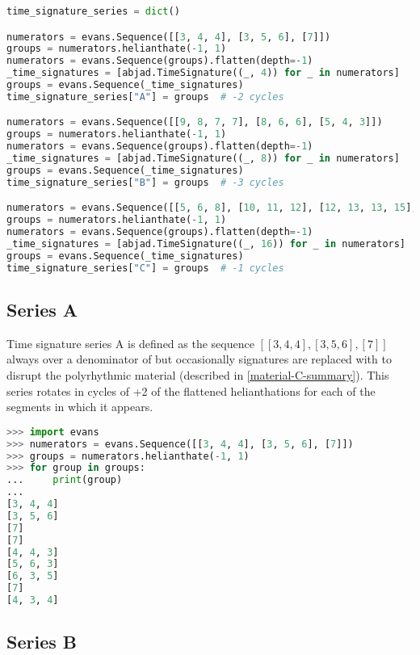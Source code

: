 \begin{lstlisting}[language=Python,frame=tb,caption={Generating processes for time signatures in Polillas},label=lst:p-sigs]
time_signature_series = dict()

numerators = evans.Sequence([[3, 4, 4], [3, 5, 6], [7]])
groups = numerators.helianthate(-1, 1)
numerators = evans.Sequence(groups).flatten(depth=-1)
_time_signatures = [abjad.TimeSignature((_, 4)) for _ in numerators]
groups = evans.Sequence(_time_signatures)
time_signature_series["A"] = groups  # -2 cycles

numerators = evans.Sequence([[9, 8, 7, 7], [8, 6, 6], [5, 4, 3]])
groups = numerators.helianthate(-1, 1)
numerators = evans.Sequence(groups).flatten(depth=-1)
_time_signatures = [abjad.TimeSignature((_, 8)) for _ in numerators]
groups = evans.Sequence(_time_signatures)
time_signature_series["B"] = groups  # -3 cycles

numerators = evans.Sequence([[5, 6, 8], [10, 11, 12], [12, 13, 13, 15], [14, 16]])
groups = numerators.helianthate(-1, 1)
numerators = evans.Sequence(groups).flatten(depth=-1)
_time_signatures = [abjad.TimeSignature((_, 16)) for _ in numerators]
groups = evans.Sequence(_time_signatures)
time_signature_series["C"] = groups  # -1 cycles
\end{lstlisting}

\subsection{Series A}

Time signature series A is defined as the sequence $[[3, 4, 4], [3, 5, 6], [7]]$ always over a denominator of  but occasionally signatures are replaced with  to disrupt the polyrhythmic material (described in \vref{material-C-summary}). This series rotates in cycles of +2 of the flattened helianthations for each of the segments in which it appears.

\begin{lstlisting}[language=Python,frame=tb,caption={Enumeration of helianthated rotations of time signature series A in Polillas},label=lst:p-sigs-a]
>>> import evans
>>> numerators = evans.Sequence([[3, 4, 4], [3, 5, 6], [7]])
>>> groups = numerators.helianthate(-1, 1)
>>> for group in groups:
...     print(group)
...
[3, 4, 4]
[3, 5, 6]
[7]
[7]
[4, 4, 3]
[5, 6, 3]
[6, 3, 5]
[7]
[4, 3, 4]
\end{lstlisting}

\subsection{Series B}

